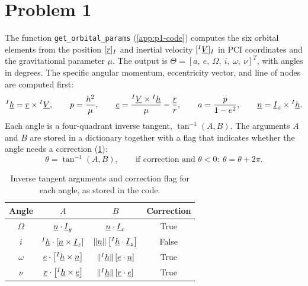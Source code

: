 \section{Problem 1}
\label{sec:problem1}

The function \texttt{get\_orbital\_params} (\cref{app:p1-code}) computes the six orbital elements from the position $[\underline{r}]_I$ and inertial velocity $[{}^{I}\underline{V}]_I$ in PCI coordinates and the gravitational parameter $\mu$. The output is $\Theta = [a,\ e,\ \Omega,\ i,\ \omega,\ \nu]^T$, with angles in degrees. The specific angular momentum, eccentricity vector, and line of nodes are computed first:
\begin{equation}
{}^{I}\underline{h} = \underline{r}\times{}^{I}\underline{V}, \qquad
p = \frac{h^2}{\mu}, \qquad
\underline{e} = \frac{{}^{I}\underline{V}\times{}^{I}\underline{h}}{\mu} - \frac{\underline{r}}{r}, \qquad
a = \frac{p}{1-e^2}, \qquad
\underline{n} = \underline{I}_z\times{}^{I}\underline{h}.
\label{eq:p1-vectors}
\end{equation}
Each angle is a four-quadrant inverse tangent, $\tan^{-1}(A, B)$. The arguments $A$ and $B$ are stored in a dictionary together with a flag that indicates whether the angle needs a correction (\cref{tab:p1-angles}):
\begin{equation}
\theta = \tan^{-1}(A, B), \qquad
\text{if correction and } \theta<0:\ \theta = \theta + 2\pi.
\end{equation}

\begin{table}[H]
\centering
\renewcommand{\arraystretch}{1.3}
\begin{tabular}{@{}cccc@{}}
\toprule
Angle & $A$ & $B$ & Correction \\
\midrule
$\Omega$ & $\underline{n}\cdot\underline{I}_y$ & $\underline{n}\cdot\underline{I}_x$ & True \\
$i$ & ${}^{I}\underline{h}\cdot\left[\underline{n}\times\underline{I}_z\right]$ & $\|\underline{n}\|\left[{}^{I}\underline{h}\cdot\underline{I}_z\right]$ & False \\
$\omega$ & $\underline{e}\cdot\left[{}^{I}\underline{h}\times\underline{n}\right]$ & $\|{}^{I}\underline{h}\|\left[\underline{e}\cdot\underline{n}\right]$ & True \\
$\nu$ & $\underline{r}\cdot\left[{}^{I}\underline{h}\times\underline{e}\right]$ & $\|{}^{I}\underline{h}\|\left[\underline{r}\cdot\underline{e}\right]$ & True \\
\bottomrule
\end{tabular}
\caption{Inverse tangent arguments and correction flag for each angle, as stored in the code.}
\label{tab:p1-angles}
\end{table}

\FloatBarrier
